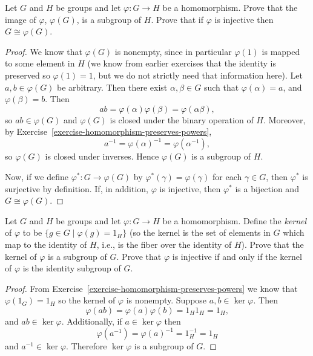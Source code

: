  Let $G$ and $H$ be groups and let $\varphi\colon G\to H$
be a homomorphism. Prove that the image of $\varphi$, $\varphi(G)$, is
a subgroup of $H$. Prove that if $\varphi$ is injective then
$G\cong\varphi(G)$.
\begin{proof}
  We know that $\varphi(G)$ is nonempty, since in particular
  $\varphi(1)$ is mapped to some element in $H$ (we know from earlier
  exercises that the identity is preserved so $\varphi(1) = 1$, but we
  do not strictly need that information here). Let $a,b\in\varphi(G)$
  be arbitrary. Then there exist $\alpha,\beta\in G$ such that
  $\varphi(\alpha) = a$, and $\varphi(\beta) = b$. Then
  \begin{equation*}
    ab = \varphi(\alpha)\varphi(\beta) = \varphi(\alpha\beta),
  \end{equation*}
  so $ab\in\varphi(G)$ and $\varphi(G)$ is closed under the binary
  operation of $H$. Moreover, by
  Exercise~\ref{exercise-homomorphism-preserves-powers},
  \begin{equation*}
    a^{-1} = \varphi(\alpha)^{-1} = \varphi(\alpha^{-1}),
  \end{equation*}
  so $\varphi(G)$ is closed under inverses. Hence $\varphi(G)$ is a
  subgroup of $H$.

  Now, if we define $\varphi^*\colon G\to\varphi(G)$ by
  $\varphi^*(\gamma) = \varphi(\gamma)$ for each $\gamma\in G$, then
  $\varphi^*$ is surjective by definition. If, in addition, $\varphi$
  is injective, then $\varphi^*$ is a bijection and
  $G\cong\varphi(G)$.
\end{proof}

 Let $G$ and $H$ be groups and let $\varphi\colon G\to H$
be a homomorphism. Define the {\em kernel} of $\varphi$ to be
$\{g\in G\mid \varphi(g) = 1_H\}$ (so the kernel is the set of
elements in $G$ which map to the identity of $H$, i.e., is the fiber
over the identity of $H$). Prove that the kernel of $\varphi$ is a
subgroup of $G$. Prove that $\varphi$ is injective if and only if the
kernel of $\varphi$ is the identity subgroup of $G$.
\begin{proof}
  From Exercise~\ref{exercise-homomorphism-preserves-powers} we know
  that $\varphi(1_G) = 1_H$ so the kernel of $\varphi$ is
  nonempty. Suppose $a,b\in\ker\varphi$. Then
  \begin{equation*}
    \varphi(ab) = \varphi(a)\varphi(b) = 1_H1_H = 1_H,
  \end{equation*}
  and $ab\in\ker\varphi$. Additionally, if $a\in\ker\varphi$ then
  \begin{equation*}
    \varphi(a^{-1}) = \varphi(a)^{-1} = 1_H^{-1} = 1_H
  \end{equation*}
  and $a^{-1}\in\ker\varphi$. Therefore $\ker\varphi$ is a subgroup of
  $G$.
\end{proof}

